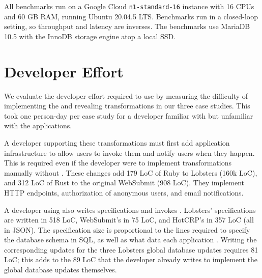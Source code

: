 All benchmarks run on a Google Cloud \texttt{n1-standard-16} instance with 16
CPUs and 60 GB RAM, running Ubuntu 20.04.5 LTS. Benchmarks run in a closed-loop
setting, so throughput and latency are inverses. %
%
The benchmarks use MariaDB 10.5 with the InnoDB storage engine atop a local SSD.
%

\section{\sys Developer Effort}
\label{s:eval-effort}


%
We evaluate the developer effort required to use \sys by measuring the
difficulty of implementing the \xxing and revealing transformations in our three
case studies.  This took one person-day per case study for a developer
familiar with \sys but unfamiliar with the applications.

A developer supporting these transformations must first add application
infrastructure to allow users to invoke them and notify users when they happen.
This is required even if the developer were to implement transformations
manually without \sys.
%
These changes add 179 LoC of Ruby to Lobsters (160k LoC), and 312 LoC of Rust
to the original WebSubmit (908 LoC). They implement HTTP endpoints,
authorization of anonymous users, and email notifications.
%

%
A developer using \sys also writes \xx specifications and invokes \sys.
Lobsters' \xx specifications are written in 518 LoC, WebSubmit's in 75 LoC, and
HotCRP's in 357 LoC (all in JSON).  The specification size is proportional to
the lines required to specify the database schema in SQL, as well as what data
each application \xxs.
%
Writing the corresponding updates for the three Lobsters global database
updates 
requires 81 LoC; this adds to the 89 LoC that the developer already
writes to implement the global database updates themselves.
%

